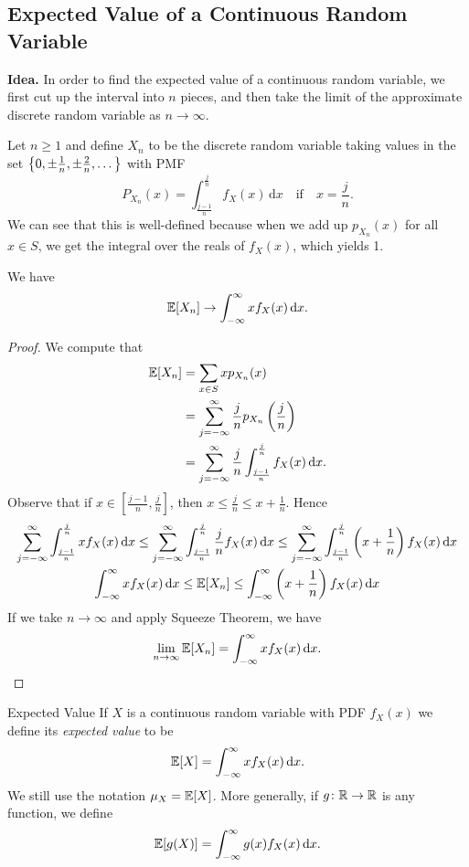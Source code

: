 \documentclass[class=article, crop=false]{standalone}
\begin{document}
  \subsection{Expected Value of a Continuous Random Variable}
  \textbf{Idea.} In order to find the expected value of a continuous random variable, we first cut up the interval into $n$ pieces, and then take the limit of the approximate discrete random variable as $n\to \infty$. \par
  Let $n \geq 1$ and define $X_n$ to be the discrete random variable taking values in the set $\left\{0, \pm \frac{1}{n}, \pm \frac{2}{n},\dotsc\right\}$ with PMF
  \[
    P_{X_n}(x) = \int_{\frac{j - 1}{n}}^{\frac{j}{n}}f_X(x) \,\mathrm dx\quad\text{if}\quad x = \frac{j}{n}.
  \]
  We can see that this is well-defined because when we add up $p_{X_n}(x)$ for all $x\in S$, we get the integral over the reals of $f_X(x)$, which yields 1.
  \begin{theorem}{}
    We have
    \[
      \mathbb{E}[X_n] \to \int_{-\infty}^{\infty}xf_X(x) \,\mathrm dx.
    \]
    \begin{proof}
      We compute that
      \begin{align*}
        \mathbb{E}[X_n] &= \sum_{x\in S} xp_{X_n}(x) \\
                &= \sum_{j=-\infty}^{\infty} \frac{j}{n}p_{X_n}\left( \frac{j}{n} \right) \\
                &= \sum_{j=-\infty}^{\infty} \frac{j}{n} \int_{\frac{j - 1}{n}}^{\frac{j}{n}}f_X(x) \,\mathrm dx.
      \end{align*}
      Observe that if $x\in [\frac{j - 1}{n}, \frac{j}{n}]$, then $x \leq \frac{j}{n} \leq x + \frac{1}{n}$. Hence
      \begin{gather*}
        \sum_{j=-\infty}^{\infty} \int_{\frac{j - 1}{n}}^{\frac{j}{n}}xf_X(x) \,\mathrm dx \leq \sum_{j=-\infty}^{\infty} \int_{\frac{j - 1}{n}}^{\frac{j}{n}}\frac{j}{n}f_X(x) \,\mathrm dx \leq \sum_{j=-\infty}^{\infty} \int_{\frac{j - 1}{n}}^{\frac{j}{n}}\left( x + \frac{1}{n} \right)f_X(x) \,\mathrm dx \\
        \int_{-\infty}^{\infty}xf_X(x) \,\mathrm dx \leq \mathbb{E}[X_n] \leq \int_{-\infty}^{\infty}\left( x + \frac{1}{n} \right)f_X(x) \,\mathrm dx
      \end{gather*}
      If we take $n\to\infty$ and apply Squeeze Theorem, we have
      \[
        \lim_{n\to \infty} \mathbb{E}[X_n] = \int_{-\infty}^{\infty}xf_X(x) \,\mathrm dx.
      \]
    \end{proof}
  \end{theorem}
  \begin{definition}{Expected Value}
    If $X$ is a continuous random variable with PDF $f_X(x)$ we define its \emph{expected value} to be
    \[
      \mathbb{E}[X] = \int_{-\infty}^{\infty}xf_X(x) \,\mathrm dx.
    \]
    We still use the notation $\mu_X = \mathbb{E}[X]$. More generally, if $g\colon \mathbb{R}\to \mathbb{R}$ is any function, we define
    \[
      \mathbb{E}[g(X)] = \int_{-\infty}^{\infty}g(x)f_X(x) \,\mathrm dx.
    \]
  \end{definition}
\end{document}
